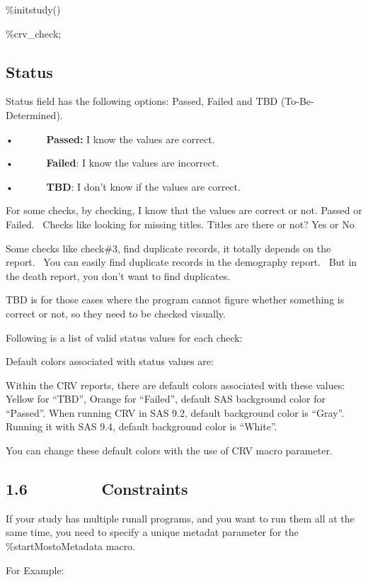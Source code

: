 \documentclass[
  letterpaper,
  DIV=11,
  numbers=noendperiod]{scrartcl}
\begin{document}
\%initstudy()

\%crv\_check;

\hypertarget{status}{%
\subsection{Status}\label{status}}

Status field has the following options: Passed, Failed and TBD
(To-Be-Determined).

•~~~~~~ \textbf{Passed:} I know the values are correct.

•~~~~~~ \textbf{Failed}: I know the values are incorrect.

•~~~~~~ \textbf{TBD}: I don't know if the values are correct.

For some checks, by checking, I know that the values are correct or not.
Passed or Failed.~ Checks like looking for missing titles. Titles are
there or not? Yes or No

Some checks like check\#3, find duplicate records, it totally depends on
the report.~ You can easily find duplicate records in the demography
report.~ But in the death report, you don't want to find duplicates.

TBD is for those cases where the program cannot figure whether something
is correct or not, so they need to be checked visually.

Following is a list of valid status values for each check:

Default colors associated with status values are:

Within the CRV reports, there are default colors associated with these
values: Yellow for ``TBD'', Orange for ``Failed'', default SAS
background color for ``Passed''. When running CRV in SAS 9.2, default
background color is ``Gray''. Running it with SAS 9.4, default
background color is ``White''.

You can change these default colors with the use of CRV macro parameter.

\hypertarget{constraints}{%
\subsection{1.6~~~~~~~~ Constraints}\label{constraints}}

If your study has multiple runall programs, and you want to run them all
at the same time, you need to specify a unique metadat parameter for the
\%startMostoMetadata macro.

For Example:~~
\end{document}
